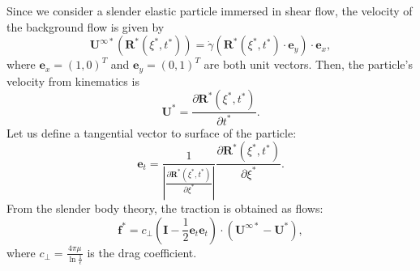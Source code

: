 \documentclass[a4paper,12pt]{report}
\begin{document}
Since we consider a slender elastic particle immersed in shear flow, the velocity of the background flow is given by
\begin{equation}
	\label{eqn:21}
	\mathbf{U}^{\infty*}(\mathbf{R}^*(\xi^*,t^*))=\dot{\gamma}\left(\mathbf{R}^*(\xi^*,t^*)\cdot\mathbf{e}_y\right)\cdot\mathbf{e}_x,
\end{equation}
where $\mathbf{e}_x=(1,0)^T$ and $\mathbf{e}_y=(0,1)^T$ are both unit vectors. Then, the particle's velocity from kinematics is 
\begin{equation}
	\label{eqn:22}
	\mathbf{U}^*=\frac{\partial\mathbf{R}^*(\xi^*,t^*)}{\partial t^*}.
\end{equation}
Let us define a tangential vector to surface of the particle:
\begin{equation}
	\label{eqn:23}
	\mathbf{e}_t=\frac{1}{|\frac{\partial\mathbf{R}^*(\xi^*,t^*)}{\partial\xi^*}|}\frac{\partial\mathbf{R}^*(\xi^*,t^*)}{\partial\xi^*}.
\end{equation}
From the slender body theory, the traction is obtained as flows:
\begin{equation}
	\label{eqn:24}
	\mathbf{f}^*=c_\perp\left(\mathbf{I}-\frac{1}{2}\mathbf{e}_t\mathbf{e}_t\right)\cdot(\mathbf{U}^{\infty*}-\mathbf{U}^*),
\end{equation}
where $c_\perp=\frac{4\pi\mu}{\ln{\frac{1}{\epsilon}}}$ is the drag coefficient. 
\end{document}
